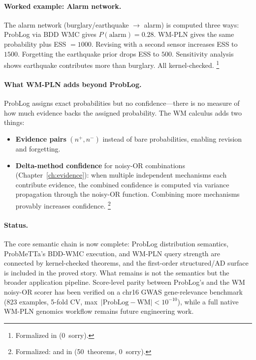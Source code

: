 \documentclass[11pt,openany]{report}
\begin{document}
\paragraph{Worked example: Alarm network.}
The alarm network (burglary/earthquake $\to$ alarm) is computed
three ways: ProbLog via BDD WMC gives $P(\mathrm{alarm}) = 0.28$.
WM-PLN gives the same probability plus ESS $= 1000$.  Revising
with a second sensor increases ESS to $1500$.  Forgetting the
earthquake prior drops ESS to $500$.  Sensitivity analysis shows
earthquake contributes more than burglary.  All kernel-checked.%
\footnote{Formalized in
(0~sorry).}

\paragraph{What WM-PLN adds beyond ProbLog.}
ProbLog assigns exact probabilities but no confidence---there is
no measure of how much evidence backs the assigned probability.
The WM calculus adds two things:
\begin{itemize}
\item \textbf{Evidence pairs} $(n^+, n^-)$ instead of bare
  probabilities, enabling revision and forgetting.
\item \textbf{Delta-method confidence} for noisy-OR combinations
  (Chapter~\ref{ch:evidence}): when multiple independent
  mechanisms each contribute evidence, the combined confidence is
  computed via variance propagation through the noisy-OR function.
  Combining more mechanisms provably increases confidence.%
  \footnote{Formalized:
   and
   in
  (50~theorems, 0~sorry).}
\end{itemize}

\paragraph{Status.}
The core semantic chain is now complete: ProbLog distribution semantics,
ProbMeTTa's BDD-WMC execution, and WM-PLN query strength are connected by
kernel-checked theorems, and the first-order structured/AD surface is included
in the proved story.  What remains is not the semantics but the broader
application pipeline.  Score-level parity between ProbLog's
 and the WM noisy-OR scorer has been verified on a chr16
GWAS gene-relevance benchmark (823 examples, 5-fold CV,
max~$|\mathrm{ProbLog} - \mathrm{WM}| < 10^{-10}$), while a full native
WM-PLN genomics workflow remains future engineering work.
\end{document}
